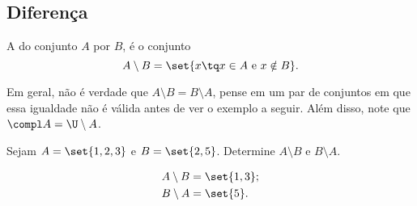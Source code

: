 \subsection{Diferença}

\begin{definition}
\label{def:setminus}
A  do conjunto $A$ por $B$, é o conjunto
%
	$$ A\setminus B = \set{x \tq  x \in A \text{ e } x \notin B}.$$
\end{definition}
\begin{remark}
Em geral, não é verdade que $A \setminus B = B \setminus A$, pense em um par de conjuntos 
em que essa igualdade não é válida antes de ver o exemplo a seguir. Além disso, note que $\compl A = \U\setminus A$.
\end{remark}

\begin{example}
	Sejam $A = \set{1, 2, 3}$ e $ B = \set{2,5}$. Determine $A \setminus B$ e $B \setminus A$.
	\end{example}
	
	\begin{solution}
	\begin{align*}
		&A \setminus B = \set{1,3};\\
		&B \setminus A = \set{5}.
	\end{align*}
	\end{solution}